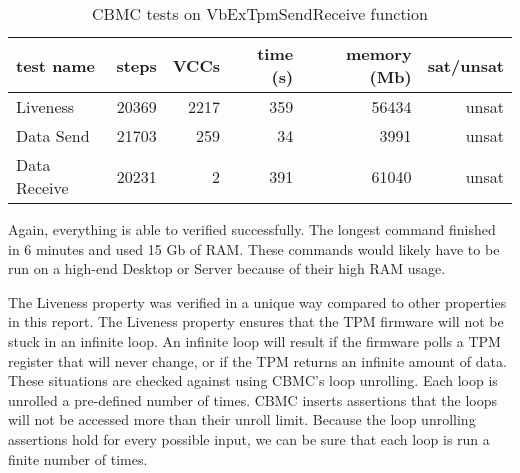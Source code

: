 \begin{table}[!htbp]
    \centering
    \caption{CBMC tests on VbExTpmSendReceive function}\label{tpmSR_results}
    \begin{tabular}{lrrrrr}
        \toprule
        test name & steps & VCCs & time (s) & memory (Mb) & sat/unsat  \\ \midrule
        Liveness & 20369 & 2217 & 359 & 56434 & unsat \\
        Data Send & 21703 & 259 & 34 & 3991 & unsat \\
        Data Receive & 20231 & 2 & 391 & 61040 & unsat \\ \bottomrule

    \end{tabular}
\end{table}

Again, everything is able to verified successfully. 
The longest command finished in 6 minutes and used 15 Gb of RAM. 
These commands would likely have to be run on a high-end Desktop or Server because of their high RAM usage.

The Liveness property was verified in a unique way compared to other properties in this report.
The Liveness property ensures that the TPM firmware will not be stuck in an infinite loop.
An infinite loop will result if the firmware polls a TPM register that will never change, or if the TPM returns an infinite amount of data.
These situations are checked against using CBMC's loop unrolling.
Each  loop is unrolled a pre-defined number of times.
CBMC inserts assertions that the loops will not be accessed more than their unroll limit.
Because the loop unrolling assertions hold for every possible input, we can be sure that each loop is run a finite number of times.
